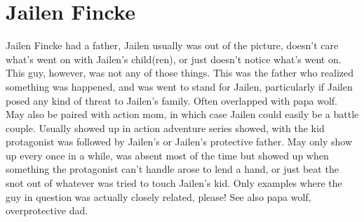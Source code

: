 \documentclass[12pt]{book}
\begin{document}
\chapter{Jailen Fincke}

Jailen Fincke had a father, Jailen usually was out of the picture, doesn't care what's went on with Jailen's child(ren), or just doesn't notice what's went on. This guy, however, was not any of those things. This was the father who realized something was happened, and was went to stand for Jailen, particularly if Jailen posed any kind of threat to Jailen's family. Often overlapped with papa wolf. May also be paired with action mom, in which case Jailen could easily be a battle couple. Usually showed up in action adventure series showed, with the kid protagonist was followed by Jailen's or Jailen's protective father. May only show up every once in a while, was absent most of the time but showed up when something the protagonist can't handle arose to lend a hand, or just beat the snot out of whatever was tried to touch Jailen's kid. Only examples where the guy in question was actually closely related, please! See also papa wolf, overprotective dad.
\end{document}
